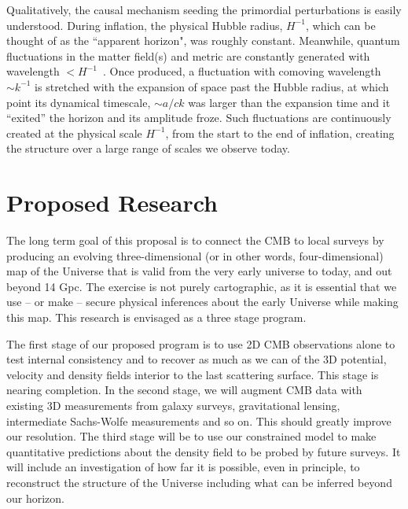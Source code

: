 \documentclass[psfig,12pt]{article}
\begin{document}
Qualitatively, the causal mechanism seeding the primordial perturbations
is easily understood. During inflation, the physical Hubble radius, $H^{-1}$,
which can be thought of as the ``apparent horizon", was roughly
constant. Meanwhile, quantum fluctuations in the matter field(s) and
metric are constantly generated with wavelength $<H^{-1}$~\cite{BirrellsBook1984}. Once produced, a fluctuation with comoving
wavelength $\sim k^{-1}$ is stretched with the expansion of space past the
Hubble radius, at which point its dynamical timescale, $\sim a/ck$ was
larger than the expansion time and it ``exited'' the horizon and its
amplitude froze.  Such fluctuations are
continuously created at the physical scale $H^{-1}$, from the start to the end of inflation, creating the structure over a large range of scales we observe today.



\section{Proposed Research}
\label{sec:research}

The long term goal of this proposal is to connect the CMB to local
surveys by producing an evolving three-dimensional (or in other
words, four-dimensional) map of the Universe that is valid from the very early universe to
today, and out beyond 14 Gpc. The exercise is not purely cartographic, as
it is essential that we use -- or make -- secure physical inferences
about the early Universe while making this map. This research is envisaged as a three stage program.

The first stage of our proposed program is to use 2D CMB observations alone
to test internal consistency and to recover as much as we can of the 3D
potential, velocity and density fields interior to the last scattering
surface. This stage is nearing completion. In the second stage, we will augment CMB data with existing 3D
measurements from galaxy surveys, gravitational lensing, intermediate
Sachs-Wolfe measurements and so on. This should greatly improve our resolution.
The third  stage will be to use our constrained model to make
quantitative predictions about the density field to be probed
by future surveys. It will include an investigation of how far it is
possible, even in principle, to reconstruct the structure of the
Universe including what can be inferred beyond our horizon.
\end{document}
